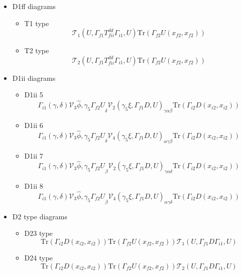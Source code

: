\documentclass{article}[12pt]
\begin{document}
\begin{itemize}
\begin{itemize}
$$$$
$$
{\mathcal V}_5(i2,f2)_{\gamma\beta}{\mathcal V}_6(i2,f2)_{\alpha\delta}(phiuf2,phidi2U)
$$
\end{itemize}
\item D1ff diagrams
\begin{itemize}
\item T1 type
$$
{\mathcal T}_1\left(U,\Gamma_{f1}T^{dd}_{fii}\Gamma_{i1},U\right)\mathrm{Tr}\left(\Gamma_{f2}U\left(x_{f2},x_{f2}\right)\right)
$$
\item T2 type
$$
{\mathcal T}_2\left(U,\Gamma_{f1}T^{dd}_{fii}\Gamma_{i1},U\right)\mathrm{Tr}\left(\Gamma_{f2}U\left(x_{f2},x_{f2}\right)\right)
$$
\end{itemize}
\item D1ii diagrams
\begin{itemize}
\item D1ii 5
$$
\Gamma_{i1}\left(\gamma,\delta\right){\mathcal V}_3{\hat{\phi},\gamma_5\Gamma_{f2}U}_\delta{\mathcal V}_2
\left(\gamma_5\xi,\Gamma_{f1}D,U\right)_{\gamma\alpha\beta}\mathrm{Tr}\left(\Gamma_{i2}D\left(x_{i2},x_{i2}\right)\right)
$$
\item D1ii 6
$$
\Gamma_{i1}\left(\gamma,\delta\right){\mathcal V}_3{\hat{\phi},\gamma_5\Gamma_{f2}U}_\delta{\mathcal V}_4
\left(\gamma_5\xi,\Gamma_{f1}D,U\right)_{\alpha\gamma\beta}\mathrm{Tr}\left(\Gamma_{i2}D\left(x_{i2},x_{i2}\right)\right)
$$
\item D1ii 7
$$
\Gamma_{i1}\left(\gamma,\delta\right){\mathcal V}_3{\hat{\phi},\gamma_5\Gamma_{f2}U}_\beta{\mathcal V}_2
\left(\gamma_5\xi,\Gamma_{f1}D,U\right)_{\gamma\alpha\delta}\mathrm{Tr}\left(\Gamma_{i2}D\left(x_{i2},x_{i2}\right)\right)
$$
\item D1ii 8
$$
\Gamma_{i1}\left(\gamma,\delta\right){\mathcal V}_3{\hat{\phi},\gamma_5\Gamma_{f2}U}_\beta{\mathcal V}_4
\left(\gamma_5\xi,\Gamma_{f1}D,U\right)_{\alpha\gamma\delta}\mathrm{Tr}\left(\Gamma_{i2}D\left(x_{i2},x_{i2}\right)\right)
$$
\end{itemize}
\item D2 type diagrams
\begin{itemize}
\item D23 type
$$
\mathrm{Tr}\left(\Gamma_{i2}D\left(x_{i2},x_{i2}\right)\right)
\mathrm{Tr}\left(\Gamma_{f2}U\left(x_{f2},x_{f2}\right)\right)
{\mathcal T}_1\left(U,\Gamma_{f1}D\Gamma_{i1},U\right)
$$
\item D24 type
$$
\mathrm{Tr}\left(\Gamma_{i2}D\left(x_{i2},x_{i2}\right)\right)\mathrm{Tr}\left(\Gamma_{f2}U\left(x_{f2},x_{f2}\right)\right){\mathcal T}_2\left(U,\Gamma_{f1}D\Gamma_{i1},U\right)
$$
\end{itemize}
\end{itemize}
\end{document}
